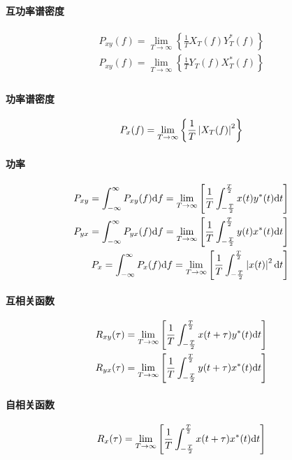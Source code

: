     \paragraph{互功率谱密度}
    \begin{equation}
        \begin{split}
            P_{xy}(f)=\lim_{T\to\infty}\left\{\frac{1}{T}X_T(f)Y_T^*(f)\right\}\\
            P_{xy}(f)=\lim_{T\to\infty}\left\{\frac{1}{T}Y_T(f)X_T^*(f)\right\}\\
        \end{split}
    \end{equation}
    \paragraph{功率谱密度}
    \begin{equation}
        P_x(f)=\lim_{T\to\infty}\left\{\frac{1}{T}\left\vert X_T(f) \right\vert^2\right\}
    \end{equation}
    \paragraph{功率}
    \begin{align}
        P_{xy}=\int_{-\infty}^{\infty}P_{xy}(f)\text{\upshape d} f=\lim_{T\to\infty}\left[\frac{1}{T}\int_{-\frac{T}{2}}^{\frac{T}{2}}x(t)y^*(t)\text{\upshape d} t\right]\\
        P_{yx}=\int_{-\infty}^{\infty}P_{yx}(f)\text{\upshape d} f=\lim_{T\to\infty}\left[\frac{1}{T}\int_{-\frac{T}{2}}^{\frac{T}{2}}y(t)x^*(t)\text{\upshape d} t\right]\\
        P_x=\int_{-\infty}^{\infty}P_x(f)\text{\upshape d} f=\lim_{T\to\infty}\left[\frac{1}{T}\int_{-\frac{T}{2}}^{\frac{T}{2}}\left\vert x(t) \right\vert^2\text{\upshape d} t\right]
    \end{align}
    \paragraph{互相关函数}
    \begin{equation}
        \begin{split}
            R_{xy}(\tau)=\lim_{T\to\infty}\left[\frac{1}{T}\int_{-\frac{T}{2}}^{\frac{T}{2}}x(t+\tau)y^*(t)\text{\upshape d} t\right]\\
            R_{yx}(\tau)=\lim_{T\to\infty}\left[\frac{1}{T}\int_{-\frac{T}{2}}^{\frac{T}{2}}y(t+\tau)x^*(t)\text{\upshape d} t\right]
        \end{split}
    \end{equation}
    \paragraph{自相关函数}
    \begin{equation}
        R_x(\tau)=\lim_{T\to\infty}\left[\frac{1}{T}\int_{-\frac{T}{2}}^{\frac{T}{2}}x(t+\tau)x^*(t)\text{\upshape d} t\right]
    \end{equation}

